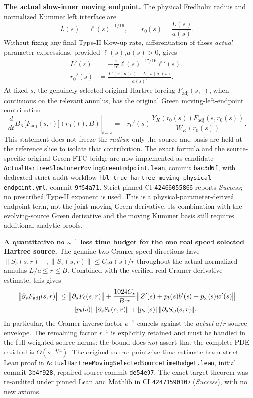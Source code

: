 \documentclass[11pt]{amsart}
\begin{document}
\medskip
\noindent\textbf{The actual slow-inner moving endpoint.}
The physical Fredholm radius and normalized Kummer left interface are
\[
 L(s)=\ell(s)^{-1/16},\qquad
 r_0(s)=\frac{L(s)}{a(s)}.
\]
Without fixing any final Type-II blow-up rate, differentiation of these
\emph{actual} parameter expressions, provided
\(\ell(s),a(s)>0\), gives
\begin{align}
 L'(s)&=-\frac1{16}\ell(s)^{-17/16}\ell'(s),\\
 r_0'(s)&=\frac{L'(s)a(s)-L(s)a'(s)}{a(s)^2}.
 \label{eq:actual-hartree-moving-green-left-velocity}
\end{align}
At fixed \(s\), the genuinely selected original Hartree forcing
\(F_{\mathrm{adj}}(s,\cdot)\), when continuous on the relevant annulus,
has the original Green moving-left-endpoint contribution
\[
 \left.\frac{d}{dt}
 B_K\bigl[F_{\mathrm{adj}}(s,\cdot)\bigr](r_0(t),B)
 \right|_{t=s}
 =-r_0'(s)\,\frac{Y_K(r_0(s))
   F_{\mathrm{adj}}(s,r_0(s))}{W_K(r_0(s))}.
\]
This statement does not freeze the \emph{radius}; only the source and
basis are held at the reference slice to isolate that contribution.
The exact formula and the source-specific original Green FTC bridge
are now implemented as candidate
\texttt{ActualHartreeSlowInnerMovingGreenEndpoint.lean},
commit \texttt{bac3d6f}, with dedicated strict audit workflow
\texttt{hbl-true-hartree-moving-physical-endpoint.yml},
commit \texttt{9f54a71}. Strict pinned CI
\texttt{42466055866} reports \emph{Success}; no prescribed
Type-II exponent is used. This is a physical-parameter-derived
endpoint term, not the joint moving Green derivative.
Its combination with the evolving-source Green derivative and
the moving Kummer basis still requires additional analytic proofs.


\medskip
\noindent\textbf{A quantitative no-\(a^{-1}\)-loss time budget for the
one real speed-selected Hartree source.}
The genuine two Cramer speed directions have
\(\|S_b(s,r)\|,\|S_\omega(s,r)\|\le C_s a(s)/r\) throughout
the actual normalized annulus \(L/a\le r\le B\). Combined with
the verified real Cramer derivative estimate, this gives
\begin{align}
 \bigl\|\partial_sF_{\rm adj}(s,r)\bigr\|
 &\le \bigl\|\partial_sF_0(s,r)\bigr\|
  +\frac{1024 C_s}{B^2r}
    \bigl\|Z'(s)+p_b(s)b'(s)+p_\omega(s)w'(s)\bigr\| \notag\\
 &\quad+|p_b(s)|\,\|\partial_sS_b(s,r)\|
  +|p_\omega(s)|\,\|\partial_sS_\omega(s,r)\|.
 \label{eq:true-hartree-selected-source-time-budget}
\end{align}
In particular, the Cramer inverse factor \(a^{-1}\) cancels against
the \emph{actual} \(a/r\) source envelope. The remaining factor
\(r^{-1}\) is explicitly retained and must be handled in the full
weighted source norms: the bound does \emph{not} assert that the
complete PDE residual is \(O(s^{-9/4})\).
The original-source pointwise time estimate has a strict Lean proof
in \texttt{ActualHartreeMovingSelectedSourceTimeBudget.lean},
initial commit \texttt{3b4f928}, repaired source commit \texttt{de54e97}.
The exact target theorem was re-audited under pinned Lean and Mathlib
in CI \texttt{42471590107} (\emph{Success}), with no new axioms.
\end{document}
